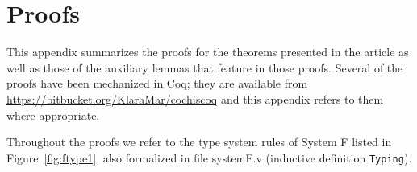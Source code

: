 \newcommand{\lnode}[4]
{\node[punkt, #2] (#1) {Lemma~\ref{#3} \nodepart{second}\it #4};}

\newcommand{\anode}[4]
{\node[punkt, #2] (#1) {Assum.~\ref{#3} \nodepart{second}\it #4};}

{}

\section{Proofs}

This appendix summarizes the proofs for the theorems presented in the article
as well as those of the auxiliary lemmas that feature in those proofs.
Several of the proofs have been mechanized in Coq; they are available from
\url{https://bitbucket.org/KlaraMar/cochiscoq} and this appendix refers to 
them where appropriate.

Throughout the proofs we refer to the type system rules of System F listed
in Figure~\ref{fig:ftype1}, also formalized in file systemF.v (inductive
definition \texttt{Typing}).

